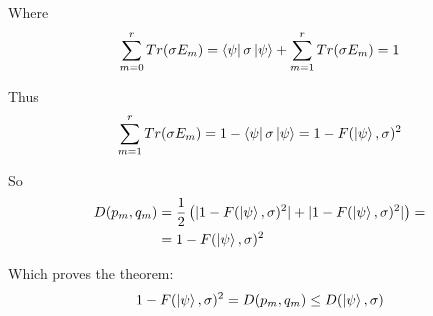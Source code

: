\documentclass{masterthesis}
\begin{document}
Where 
\begin{equation}
    \sum_{m=0}^{r} Tr(\sigma E_m) = \bra{\psi} \sigma \ket{\psi} + \sum_{m=1}^{r} Tr(\sigma E_m) = 1
\end{equation}

Thus
\begin{equation}
    \sum_{m=1}^{r} Tr(\sigma E_m) = 1 - \bra{\psi} \sigma \ket{\psi} = 1 - F(\ket{\psi}, \sigma)^2
\end{equation}

So
\begin{align}
    D(p_m, q_m) &= \frac{1}{2} \left(|1 - F(\ket{\psi}, \sigma)^2 | + |1 - F(\ket{\psi}, \sigma)^2 |\right) = \\
    &= 1 - F(\ket{\psi}, \sigma)^2 
\end{align}

Which proves the theorem:
\begin{equation}
    1 - F(\ket{\psi}, \sigma)^2 = D(p_m, q_m) \leq D(\ket{\psi}, \sigma)
\end{equation}
\end{document}
